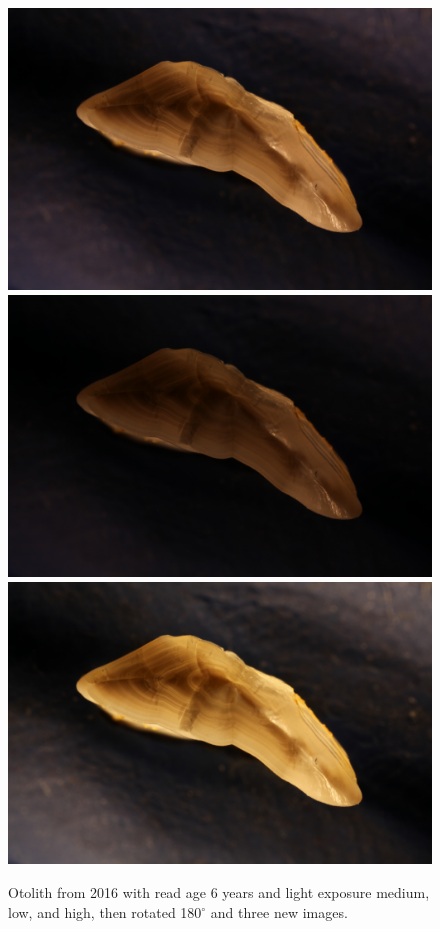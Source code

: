 \documentclass[10pt,letterpaper]{article}
\begin{document}
\begin{figure}[h!]
  \caption{Otolith from 2016 with read age 6 years and light exposure medium, low, and high, then rotated 180$^{\circ}$ 
  and three new images.}
  \centering
  \includegraphics[scale=0.015]{otolith/IMG_0457_2016_70021.JPG}
  \includegraphics[scale=0.015]{otolith/IMG_0458_2016_70021.JPG}
  \includegraphics[scale=0.015]{otolith/IMG_0459_2016_70021.JPG} 


\end{figure}
\end{document}
